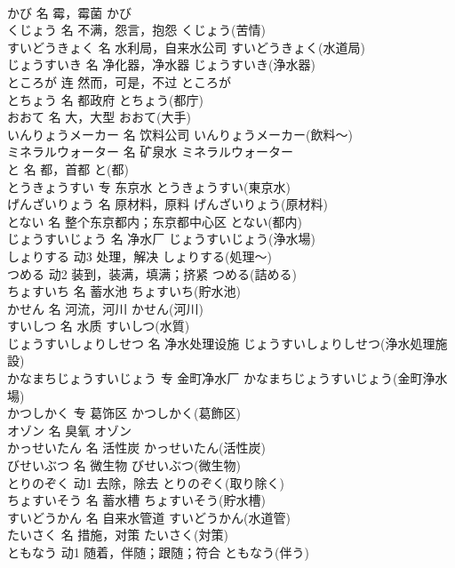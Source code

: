 \documentclass[8pt]{extreport}
\begin{document}
\begin{CJK}{UTF8}{min}
\\	かび	名	霉，霉菌	かび	
\\	くじょう	名	不满，怨言，抱怨	くじょう(苦情)	
\\	すいどうきょく	名	水利局，自来水公司	すいどうきょく(水道局)	
\\	じょうすいき	名	净化器，净水器	じょうすいき(浄水器)	
\\	ところが	连	然而，可是，不过	ところが	
\\	とちょう	名	都政府	とちょう(都庁)	
\\	おおて	名	大，大型	おおて(大手)	
\\	いんりょうメーカー	名	饮料公司	いんりょうメーカー(飲料～)	
\\	ミネラルウォーター	名	矿泉水	ミネラルウォーター	
\\	と	名	都，首都	と(都)	
\\	とうきょうすい	专	东京水	とうきょうすい(東京水)	
\\	げんざいりょう	名	原材料，原料	げんざいりょう(原材料)	
\\	とない	名	整个东京都内；东京都中心区	とない(都内)	
\\	じょうすいじょう	名	净水厂	じょうすいじょう(浄水場)	
\\	しょりする	动3	处理，解决	しょりする(処理～)	
\\	つめる	动2	装到，装满，填满；挤紧	つめる(詰める)	
\\	ちょすいち	名	蓄水池	ちょすいち(貯水池)	
\\	かせん	名	河流，河川	かせん(河川)	
\\	すいしつ	名	水质	すいしつ(水質)	
\\	じょうすいしょりしせつ	名	净水处理设施	じょうすいしょりしせつ(浄水処理施設)	
\\	かなまちじょうすいじょう	专	金町净水厂	かなまちじょうすいじょう(金町浄水場)	
\\	かつしかく	专	葛饰区	かつしかく(葛飾区)	
\\	オゾン	名	臭氧	オゾン	
\\	かっせいたん	名	活性炭	かっせいたん(活性炭)	
\\	びせいぶつ	名	微生物	びせいぶつ(微生物)	
\\	とりのぞく	动1	去除，除去	とりのぞく(取り除く)	
\\	ちょすいそう	名	蓄水槽	ちょすいそう(貯水槽)	
\\	すいどうかん	名	自来水管道	すいどうかん(水道管)	
\\	たいさく	名	措施，对策	たいさく(対策)	
\\	ともなう	动1	随着，伴随；跟随；符合	ともなう(伴う)	

\end{CJK}
\end{document}
